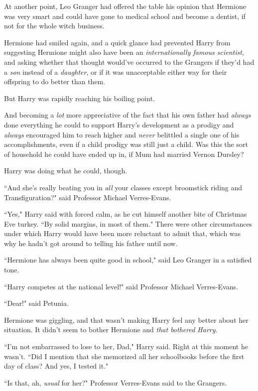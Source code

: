 At another point, Leo Granger had offered the table his opinion that Hermione was very smart and could have gone to medical school and become a dentist, if not for the whole witch business.

Hermione had smiled again, and a quick glance had prevented Harry from suggesting Hermione might also have been an \emph{internationally famous scientist}, and asking whether that thought would've occurred to the Grangers if they'd had a \emph{son} instead of a \emph{daughter}, or if it was unacceptable either way for their offspring to do better than them.

But Harry was rapidly reaching his boiling point.

And becoming a \emph{lot} more appreciative of the fact that his own father had \emph{always} done everything he could to support Harry's development as a prodigy and \emph{always} encouraged him to reach higher and \emph{never} belittled a single one of his accomplishments, even if a child prodigy was still just a child. Was this the sort of household he could have ended up in, if Mum had married Vernon Dursley?

Harry was doing what he could, though.

``And she's really beating you in \emph{all} your classes except broomstick riding and Transfiguration?" said Professor Michael Verres-Evans.

``Yes," Harry said with forced calm, as he cut himself another bite of Christmas Eve turkey. ``By solid margins, in most of them." There were other circumstances under which Harry would have been more reluctant to admit that, which was why he hadn't got around to telling his father until now.

``Hermione has always been quite good in school," said Leo Granger in a satisfied tone.

``Harry competes at the national level!" said Professor Michael Verres-Evans.

``Dear!" said Petunia.

Hermione was giggling, and that wasn't making Harry feel any better about her situation. It didn't seem to bother Hermione and \emph{that bothered Harry.}

``I'm not embarrassed to lose to her, Dad," Harry said. Right at this moment he wasn't. ``Did I mention that she memorized all her schoolbooks before the first day of class? And yes, I tested it."

``Is that, ah, \emph{usual} for her?" Professor Verres-Evans said to the Grangers.

